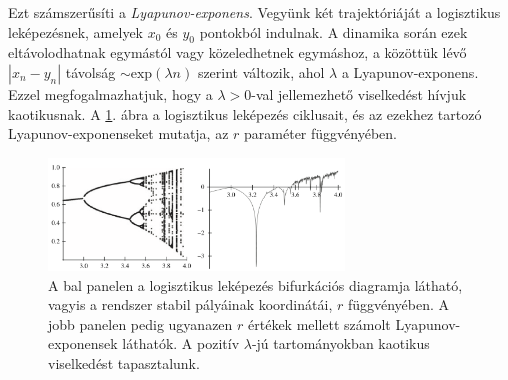 \documentclass[12pt]{article}
\theoremstyle{plain}
\begin{document}
Ezt számszerűsíti a {\em Lyapunov-exponens}. Vegyünk két trajektóriáját a logisztikus leképezésnek, amelyek $x_0$ és $y_0$ pontokból indulnak. A dinamika során ezek eltávolodhatnak egymástól vagy közeledhetnek egymáshoz, a közöttük lévő $|x_n - y_n|$ távolság $\sim \text{exp}(\lambda n)$ szerint változik, ahol $\lambda$ a Lyapunov-exponens. Ezzel megfogalmazhatjuk, hogy a $\lambda > 0$-val jellemezhető viselkedést hívjuk kaotikusnak. A \ref{fig:lyap}. ábra a logisztikus leképezés ciklusait, és az ezekhez tartozó Lyapunov-exponenseket mutatja, az $r$ paraméter függvényében.

\begin{figure}[H]
    \centering
    \includegraphics[width = 0.7\textwidth]{media/lyap.PNG}
    \caption{A bal panelen a logisztikus leképezés bifurkációs diagramja látható, vagyis a rendszer stabil pályáinak koordinátái, $r$ függvényében. A jobb panelen pedig ugyanazen $r$ értékek mellett számolt Lyapunov-exponensek láthatók. A pozitív $\lambda$-jú tartományokban kaotikus viselkedést tapasztalunk. }
    \label{fig:lyap}
\end{figure}

\vfill



\end{document}
